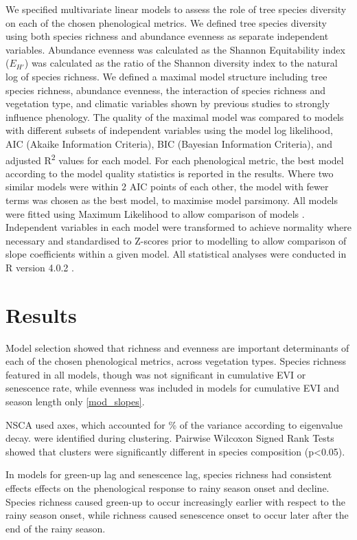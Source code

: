 \documentclass[11pt,a4paper]{article}
\begin{document}
We specified multivariate linear models to assess the role of tree species diversity on each of the chosen phenological metrics. We defined tree species diversity using both species richness and abundance evenness as separate independent variables. Abundance evenness was calculated as the Shannon Equitability index ($E_{H'}$) \citep{Smith1996} was calculated as the ratio of the Shannon diversity index to the natural log of species richness. We defined a maximal model structure including tree species richness, abundance evenness, the interaction of species richness and vegetation type, and climatic variables shown by previous studies to strongly influence phenology. The quality of the maximal model was compared to models with different subsets of independent variables using the model log likelihood, AIC (Akaike Information Criteria), BIC (Bayesian Information Criteria), and adjusted R\textsuperscript{2} values for each model. For each phenological metric, the best model according to the model quality statistics is reported in the results. Where two similar models were within 2 AIC points of each other, the model with fewer terms was chosen as the best model, to maximise model parsimony. All models were fitted using Maximum Likelihood to allow comparison of models \citep{}. Independent variables in each model were transformed to achieve normality where necessary and standardised to Z-scores prior to modelling to allow comparison of slope coefficients within a given model. All statistical analyses were conducted in R version 4.0.2 \citep{R2020}.

\section{Results}

Model selection showed that richness and evenness are important determinants of each of the chosen phenological metrics, across vegetation types. Species richness featured in all models, though was not significant in cumulative EVI or senescence rate, while evenness was included in models for cumulative EVI and season length only \autoref{mod_slopes}. 

NSCA used \nscaAxes{} axes, which accounted for \nscaInertia{}\% of the variance according to eigenvalue decay. \nCluster{} were identified during clustering. Pairwise Wilcoxon Signed Rank Tests showed that clusters were significantly different in species composition (p<0.05). 

In models for green-up lag and senescence lag, species richness had consistent effects effects on the phenological response to rainy season onset and decline. Species richness caused green-up to occur increasingly earlier with respect to the rainy season onset, while richness caused senescence onset to occur later after the end of the rainy season.
\end{document}

